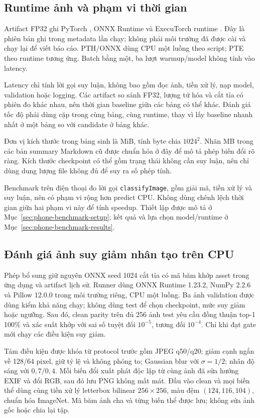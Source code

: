 \subsection{Runtime ảnh và phạm vi thời gian}
Artifact FP32 ghi PyTorch \BenchmarkPytorchVersion{}, ONNX Runtime \BenchmarkOnnxVersion{} và ExecuTorch runtime \BenchmarkExecutorchVersion{}. Đây là phiên bản ghi trong metadata lần chạy; không phải môi trường đã được cài và chạy lại để viết báo cáo. PTH/ONNX dùng CPU một luồng theo script; PTE theo runtime tương ứng. Batch bằng một, ba lượt warmup/model không tính vào latency.

Latency chỉ tính lời gọi suy luận, không bao gồm đọc ảnh, tiền xử lý, nạp model, validation hoặc logging. Các artifact so sánh FP32, lượng tử hóa và cắt tỉa có phiên đo khác nhau, nên thời gian baseline giữa các bảng có thể khác. Đánh giá tốc độ phải dùng cặp trong cùng bảng, cùng runtime, thay vì lấy baseline nhanh nhất ở một bảng so với candidate ở bảng khác.

Đơn vị kích thước trong bảng sinh là MiB, tính byte chia $1024^2$. Nhãn MB trong các bản summary Markdown cũ được chuẩn hóa ở đây để mô tả phép biến đổi rõ ràng. Kích thước checkpoint có thể gồm trạng thái không cần suy luận, nên chỉ dùng dung lượng file không đủ để suy ra số phép tính.

Benchmark trên điện thoại đo lời gọi \texttt{classifyImage}, gồm giải mã, tiền xử lý và suy luận, nên có phạm vi rộng hơn predict CPU. Không dùng chênh lệch thời gian giữa hai phạm vi này để tính speedup. Thiết lập được mô tả ở Mục~\ref{sec:phone-benchmark-setup}; kết quả và lựa chọn model/runtime ở Mục~\ref{sec:phone-benchmark-results}.

\subsection{Đánh giá ảnh suy giảm nhân tạo trên CPU}\label{sec:image-quality-cpu-setup}
Phép bổ sung giữ nguyên ONNX seed 1024 cắt tỉa có mã băm khớp asset trong ứng dụng và artifact lịch sử. Runner dùng ONNX Runtime 1.23.2, NumPy 2.2.6 và Pillow 12.0.0 trong môi trường riêng, CPU một luồng. Ba ảnh validation được dùng kiểm khả năng chạy; không dùng test để chọn checkpoint, mức suy giảm hoặc ngưỡng. Sau đó, clean parity trên đủ 256 ảnh test yêu cầu đồng thuận top-1 100\% và xác suất khớp với sai số tuyệt đối $10^{-5}$, tương đối $10^{-4}$. Chỉ khi đạt gate mới chạy các điều kiện suy giảm.

Tám điều kiện được khóa từ protocol trước gồm JPEG q50/q20; giảm cạnh ngắn về 128/64 pixel, giữ tỷ lệ và không phóng to; Gaussian blur với $\sigma=1/2$; nhân độ sáng với $0{,}7/0{,}4$. Mỗi biến đổi xuất phát độc lập từ cùng ảnh đã sửa hướng EXIF và đổi RGB, sau đó lưu PNG không mất mát. Đầu vào clean và mọi biến thể dùng cùng tiền xử lý letterbox bilinear $256\times256$, màu đệm $(124,116,104)$, chuẩn hóa ImageNet. Mã băm ảnh cha và từng biến thể được lưu; không sửa ảnh gốc hoặc chia lại tập.

